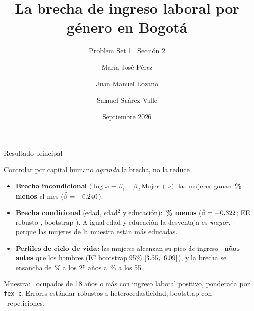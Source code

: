 \documentclass[aspectratio=169]{beamer}
\title[Brecha de género]{La brecha de ingreso laboral por género en Bogotá}
\subtitle{Problem Set 1 \textbullet\ Sección 2}
\author[Perez, Lozano, Suarez]{María José Pérez \and Juan Manuel Lozano \and Samuel Suárez Valle}
\institute[Uniandes]{MECA 4107 --- Big Data y Machine Learning para Economía Aplicada}
\date{Septiembre 2026}
\begin{document}
\begin{frame}[plain]
  \titlepage
\end{frame}

\begin{frame}{Resultado principal}
  \begin{block}{Controlar por capital humano \emph{agranda} la brecha, no la reduce}
    \begin{itemize}
      \item \textbf{Brecha incondicional}
        $\bigl(\log w = \beta_1 + \beta_2\,\text{Mujer} + u\bigr)$:
        las mujeres ganan \textbf{\GapUncondPct\,\% menos} al mes
        ($\hat\beta = -0.240$).
      \item \textbf{Brecha condicional} (edad, edad$^2$ y educación):
        \textbf{\GapHKPct\,\% menos}
        ($\hat\beta = -0.322$; EE robusto \GapHKSE, bootstrap \GapHKSEBoot).
        A igual edad y educación la desventaja es \emph{mayor}, porque las
        mujeres de la muestra están más educadas.
      \item \textbf{Perfiles de ciclo de vida:} las mujeres alcanzan su pico de
        ingreso \textbf{\PeakDiff\ años antes} que los hombres
        (IC bootstrap 95\% $[\PeakDiffLo,\ \PeakDiffHi]$), y la brecha se
        ensancha de \GapAtTwentyFive\,\% a los 25 años a
        \GapAtFiftyFive\,\% a los 55.
    \end{itemize}
  \end{block}
  \vfill
  {\footnotesize Muestra: \GapNobs\ ocupados de 18 años o más con ingreso laboral
  positivo, ponderada por \texttt{fex\_c}. Errores estándar robustos a
  heterocedasticidad; bootstrap con \GapBootReps\ repeticiones.}
\end{frame}
\end{document}
